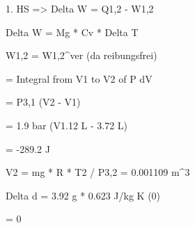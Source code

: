 1. HS => Delta W = Q1,2 - W1,2

Delta W = Mg * Cv * Delta T

W1,2 = W1,2^ver (da reibungsfrei)

= Integral from V1 to V2 of P dV

= P3,1 (V2 - V1)

= 1.9 bar (V1.12 L - 3.72 L)

= -289.2 J

V2 = mg * R * T2 / P3,2 = 0.001109 m^3

Delta d = 3.92 g * 0.623 J/kg K (0)

= 0